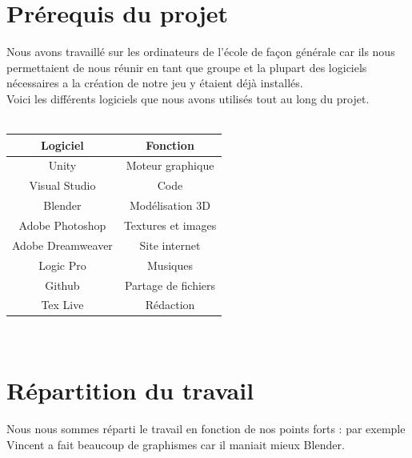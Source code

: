 \documentclass[12pt, titlepage]{article}
\begin{document}
\begin{spacing}{1.5}
\section{Prérequis du projet}

Nous avons travaillé sur les ordinateurs de l'école de façon générale car ils nous permettaient de nous réunir en tant que groupe et la plupart des logiciels nécessaires a la création de notre jeu y étaient déjà installés.\\

Voici les différents logiciels que nous avons utilisés tout au long du projet.\\ \\

\begin{center}
\begin{tabular}{|c|c|}
\hline
Logiciel & Fonction\\
\hline
Unity & Moteur graphique\\
\hline
Visual Studio & Code\\
\hline
Blender & Modélisation 3D\\
\hline
Adobe Photoshop & Textures et images\\
\hline
Adobe Dreamweaver & Site internet\\
\hline
Logic Pro & Musiques\\
\hline
Github & Partage de fichiers\\
\hline
Tex Live & Rédaction\\
\hline
\end{tabular}\\

\end{center}

\newpage
\section{Répartition du travail}

Nous nous sommes réparti le travail en fonction de nos points forts : par exemple Vincent a fait beaucoup de graphismes car il maniait mieux Blender.\\


\end{spacing}
\end{document}
